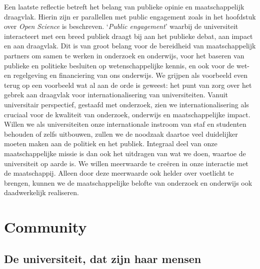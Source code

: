 \documentclass[smallauthor, chapterhaspagenum, nochapterinheader, pagenuminheader,  bigchapnum,medium2, tocpages,  garamond, titleinheader]{jote-book}
\begin{document}
	Een laatste reflectie betreft het belang van publieke opinie en maatschappelijk draagvlak. Hierin zijn er parallellen met public engagement zoals in het hoofdstuk over \emph{Open }\emph{Science} is beschreven. ‘\emph{Public engagement}' waarbij de universiteit interacteert met een breed publiek draagt bij aan het publieke debat, aan impact en aan draagvlak. Dit is van groot belang voor de bereidheid van maatschappelijk partners om samen te werken in onderzoek en onderwijs, voor het baseren van publieke en politieke besluiten op wetenschappelijke kennis, en ook voor de wet- en regelgeving en financiering van ons onderwijs. We grijpen als voorbeeld even terug op een voorbeeld wat al aan de orde is geweest: het punt van zorg over het gebrek aan draagvlak voor internationalisering van universiteiten. Vanuit universitair perspectief, gestaafd met onderzoek, zien we internationalisering als cruciaal voor de kwaliteit van onderzoek, onderwijs en maatschappelijke impact. Willen we als universiteiten onze internationale instroom van staf en studenten behouden of zelfs uitbouwen, zullen we de noodzaak daartoe veel duidelijker moeten maken aan de politiek en het publiek. Integraal deel van onze maatschappelijke missie is dan ook het uitdragen van wat we doen, waartoe de universiteit op aarde is. We willen meerwaarde te creëren in onze interactie met de maatschappij. Alleen door deze meerwaarde ook helder over voetlicht te brengen, kunnen we de maatschappelijke belofte van onderzoek en onderwijs ook daadwerkelijk realiseren.







	\chapter{Community }



	\section{De universiteit, dat zijn haar mensen }
\end{document}
